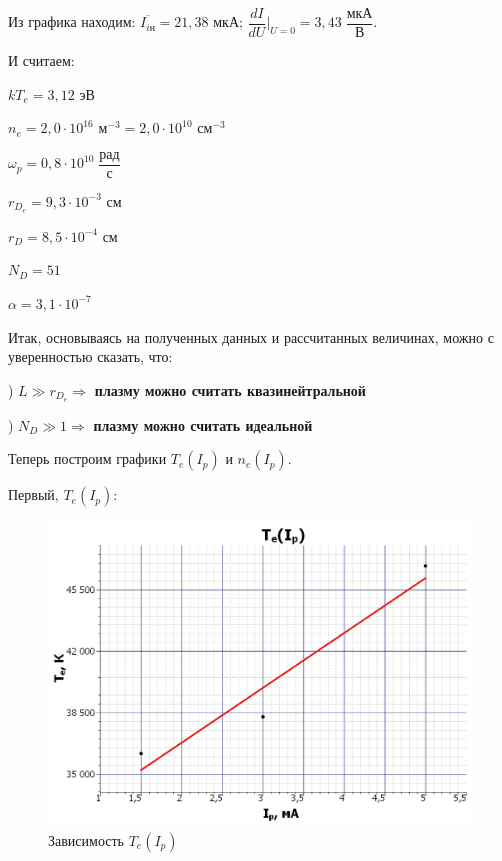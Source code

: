 \documentclass[a4paper,12pt]{article} %
\begin{document}
Из графика находим: $\overline{I_{i\text{н}}} = 21,38$ мкА;  $\dfrac{dI}{dU}\bigg|_{U = 0} = 3,43\;\dfrac{\text{мкА}}{\text{В}}$.

И считаем:

$\boxed{kT_e = 3,12 \text{ эВ}}$
\vspace{3mm}

$\boxed{n_e = 2,0 \cdot 10^{16} \text{ м}^{-3} = 2,0 \cdot 10^{10} \text{ см}^{-3}}$
\vspace{3mm}

$\boxed{\omega_p = 0,8 \cdot 10^{10} \; \dfrac{\text{рад}}{\text{с}}}$
\vspace{3mm}

$\boxed{r_{D_e} = 9,3 \cdot 10^{-3} \text{ см}}$
\vspace{3mm}

$\boxed{r_D = 8,5 \cdot 10^{-4} \text{ см}}$
\vspace{3mm}

$\boxed{N_D = 51}$
\vspace{3mm}

$\boxed{\alpha = 3,1 \cdot 10^{-7}}$


\newpage

Итак, основываясь на полученных данных и рассчитанных величинах, можно с уверенностью сказать, что:
\vspace{3mm}

) $L \gg r_{D_e} \Longrightarrow$ \textbf{ плазму можно считать квазинейтральной}
\vspace{3mm}

) $N_D \gg 1 \Longrightarrow$ \textbf{ плазму можно считать идеальной}
\vspace{15mm}


Теперь построим графики $T_e(I_p)$ и $n_e(I_p)$.

Первый, $T_e(I_p)$:

\begin{figure}[h!]
	\centering
	\includegraphics[scale=0.7]{Pictures/T(I).jpg}
	\caption{Зависимость $T_e(I_p)$}
\end{figure}
\end{document}
